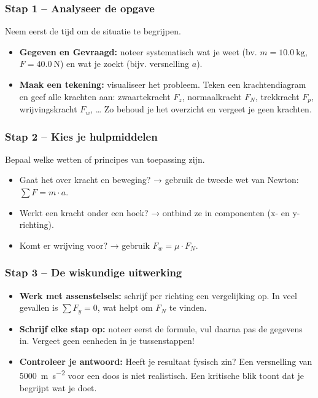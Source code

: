 \documentclass{ximera}
\begin{document}
\subsubsection{Stap 1 – Analyseer de opgave}
Neem eerst de tijd om de situatie te begrijpen.
\begin{itemize}
  \item \textbf{Gegeven en Gevraagd:} noteer systematisch wat je weet (bv. $m=\qty{10,0}{\kilogram}$, $F=\qty{40,0}{\newton}$) en wat je zoekt (bijv. versnelling $a$).
  \item \textbf{Maak een tekening:} visualiseer het probleem.  
  Teken een krachtendiagram en geef alle krachten aan: zwaartekracht $F_z$, normaalkracht $F_N$, trekkracht $F_p$, wrijvingskracht $F_w$, …  
  Zo behoud je het overzicht en vergeet je geen krachten.
\end{itemize}

\subsubsection{Stap 2 – Kies je hulpmiddelen}
Bepaal welke wetten of principes van toepassing zijn.
\begin{itemize}
  \item Gaat het over kracht en beweging? → gebruik de tweede wet van Newton: $\sum F = m \cdot a$.
  \item Werkt een kracht onder een hoek? → ontbind ze in componenten (x- en y-richting).
  \item Komt er wrijving voor? → gebruik $F_w = \mu \cdot F_N$.
\end{itemize}

\subsubsection{Stap 3 – De wiskundige uitwerking}
\begin{itemize}
  \item \textbf{Werk met assenstelsels:} schrijf per richting een vergelijking op. In veel gevallen is $\sum F_y = 0$, wat helpt om $F_N$ te vinden.
  \item \textbf{Schrijf elke stap op:} noteer eerst de formule, vul daarna pas de gegevens in. Vergeet geen eenheden in je tussenstappen!
  \item \textbf{Controleer je antwoord:}  
  Heeft je resultaat fysisch zin? Een versnelling van \qty{5000}{\metre\per\second\squared} voor een doos is niet realistisch.  
  Een kritische blik toont dat je begrijpt wat je doet.
\end{itemize}
\end{document}
